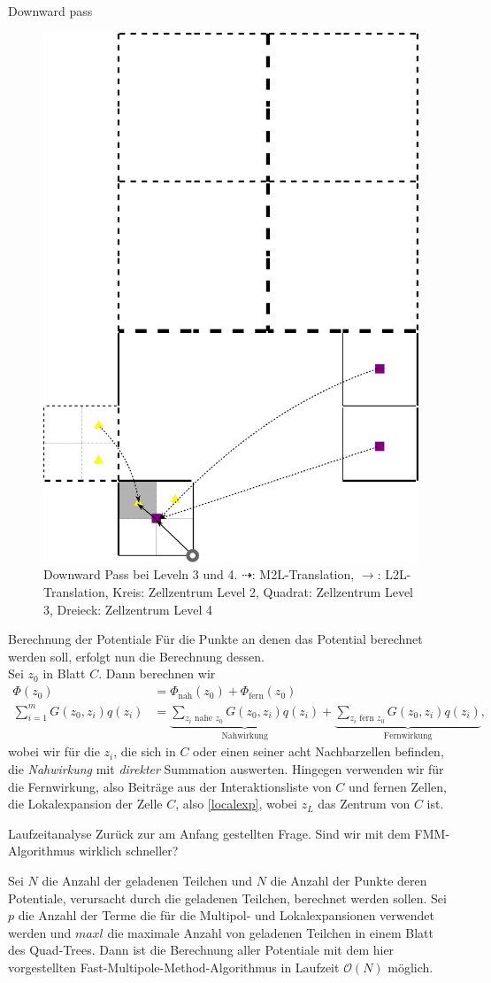 \documentclass[ngerman]{beamer}
\begin{document}
\begin{frame}{Downward pass}
\begin{figure}
\includegraphics[height=0.5\textwidth]{downpass2.png}
\caption{Downward Pass bei Leveln 3 und 4. $\dashrightarrow$: M2L-Translation, $\rightarrow$: L2L-Translation, Kreis: Zellzentrum Level 2, Quadrat: Zellzentrum Level 3, Dreieck: Zellzentrum Level 4}
\end{figure}
\end{frame}

\begin{frame}{Berechnung der Potentiale}
Für die Punkte an denen das Potential berechnet werden soll, erfolgt nun die Berechnung dessen.\\
Sei $z_0$ in Blatt $C$.
Dann berechnen wir 
\begin{align*}
\Phi(z_0) &= \Phi_{\text{nah}}(z_0) + \Phi_{\text{fern}}(z_0) &\\
\sum_{i=1}^m {G(z_0,z_i)q(z_i)} &= \underbrace{\sum_{z_i\text{ nahe } z_0 } G(z_0,z_i)q(z_i)}_{\text{Nahwirkung}} + \underbrace{\sum_{z_i\text{ fern }z_0} G(z_0,z_i)q(z_i)}_\text{Fernwirkung},
\end{align*}
wobei wir für die $z_i$, die sich in $C$ oder einen seiner acht Nachbarzellen befinden, die \emph{Nahwirkung} mit \emph{direkter} Summation auswerten. Hingegen verwenden wir für die Fernwirkung, also Beiträge aus der Interaktionsliste von $C$ und fernen Zellen, die Lokalexpansion der Zelle $C$, also \eqref{localexp}, wobei $z_L$ das Zentrum von $C$ ist.
\end{frame}

\begin{frame}{Laufzeitanalyse}
Zurück zur am Anfang gestellten Frage. Sind wir mit dem FMM-Algorithmus wirklich schneller?
\begin{Satz}
Sei $N$ die Anzahl der geladenen Teilchen und $N$ die Anzahl der Punkte deren Potentiale, verursacht durch die geladenen Teilchen, berechnet werden sollen. Sei $p$ die Anzahl der Terme die für die Multipol- und Lokalexpansionen verwendet werden und $maxl$ die maximale Anzahl von geladenen Teilchen in einem Blatt des Quad-Trees. Dann ist die Berechnung aller Potentiale mit dem hier vorgestellten Fast-Multipole-Method-Algorithmus in Laufzeit $\mathcal{O}(N)$ möglich.
\end{Satz}
\end{frame}
\end{document}
